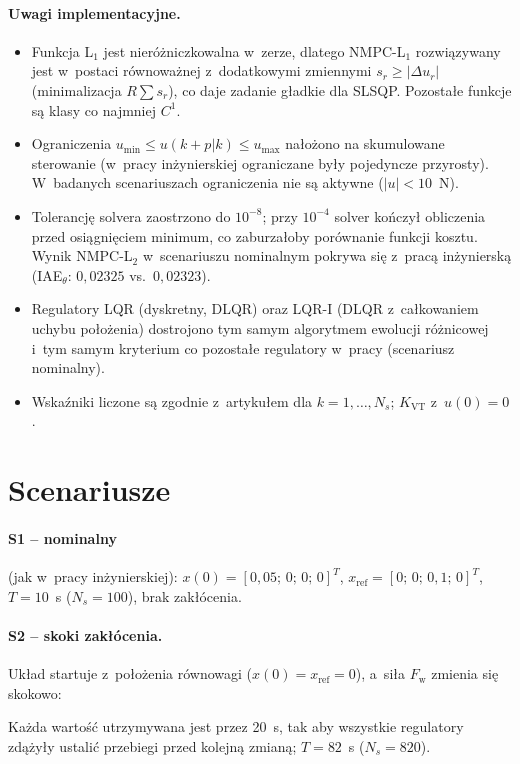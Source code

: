\documentclass[a4paper,10pt]{article}
\begin{document}
\paragraph{Uwagi implementacyjne.}
\begin{itemize}
\item Funkcja L$_1$ jest nieróżniczkowalna w~zerze, dlatego NMPC-L$_1$ rozwiązywany jest
w~postaci równoważnej z~dodatkowymi zmiennymi $s_r\ge|\Delta u_r|$ (minimalizacja $R\sum s_r$),
co daje zadanie gładkie dla SLSQP. Pozostałe funkcje są klasy co najmniej $C^1$.
\item Ograniczenia $u_\mathrm{min}\le u(k+p|k)\le u_\mathrm{max}$ nałożono na skumulowane
sterowanie (w~pracy inżynierskiej ograniczane były pojedyncze przyrosty). W~badanych scenariuszach
ograniczenia nie są aktywne ($|u|<10$~N).
\item Tolerancję solvera zaostrzono do $10^{-8}$; przy $10^{-4}$ solver kończył obliczenia przed
osiągnięciem minimum, co zaburzałoby porównanie funkcji kosztu. Wynik NMPC-L$_2$ w~scenariuszu
nominalnym pokrywa się z~pracą inżynierską (IAE$_\theta$: $0{,}02325$ vs.~$0{,}02323$).
\item Regulatory LQR (dyskretny, DLQR) oraz LQR-I (DLQR z~całkowaniem uchybu położenia)
dostrojono tym samym algorytmem ewolucji różnicowej i~tym samym kryterium co pozostałe regulatory
w~pracy (scenariusz nominalny).
\item Wskaźniki liczone są zgodnie z~artykułem dla $k=1,\ldots,N_s$; $K_\mathrm{VT}$ z~$u(0)=0$.
\end{itemize}

\section{Scenariusze}

\paragraph{S1 -- nominalny} (jak w~pracy inżynierskiej): $x(0)=[0{,}05;\,0;\,0;\,0]^T$,
$x_\mathrm{ref}=[0;\,0;\,0{,}1;\,0]^T$, $T=10$~s ($N_s=100$), brak zakłócenia.

\paragraph{S2 -- skoki zakłócenia.} Układ startuje z~położenia równowagi
($x(0)=x_\mathrm{ref}=0$), a~siła $F_\mathrm{w}$ zmienia się skokowo:

Każda wartość utrzymywana jest przez 20~s, tak aby wszystkie regulatory zdążyły ustalić
przebiegi przed kolejną zmianą; $T=82$~s ($N_s=820$).
\end{document}
